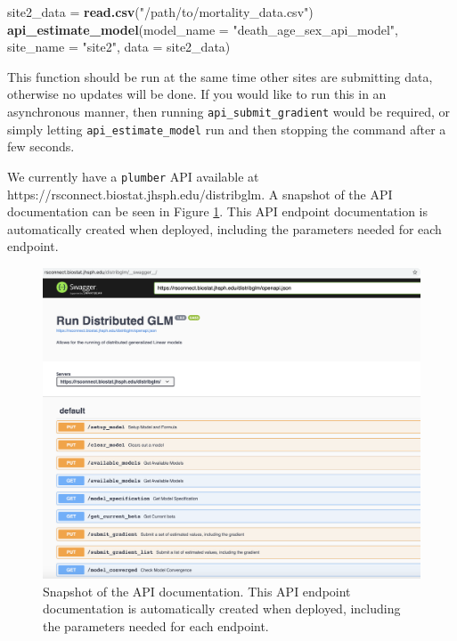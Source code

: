 \documentclass[]{elsarticle} %
\makeatletter
\newenvironment{Shaded}{\begin{snugshade}}{\end{snugshade}}
\newcommand{\DataTypeTok}[1]{\textcolor[rgb]{0.13,0.29,0.53}{#1}}
\newcommand{\KeywordTok}[1]{\textcolor[rgb]{0.13,0.29,0.53}{\textbf{#1}}}
\newcommand{\NormalTok}[1]{#1}
\newcommand{\StringTok}[1]{\textcolor[rgb]{0.31,0.60,0.02}{#1}}
\def\maxwidth{\ifdim\Gin@nat@width>\linewidth\linewidth
\else\Gin@nat@width\fi}
\let\Oldincludegraphics\includegraphics
\renewcommand{\includegraphics}[1]{\Oldincludegraphics[width=\maxwidth]{#1}}
\makeatother
\begin{document}
\begin{Shaded}
\begin{Highlighting}[]
\NormalTok{site2\_data =}\StringTok{ }\KeywordTok{read.csv}\NormalTok{(}\StringTok{"/path/to/mortality\_data.csv"}\NormalTok{)}
\KeywordTok{api\_estimate\_model}\NormalTok{(}\DataTypeTok{model\_name =}  \StringTok{"death\_age\_sex\_api\_model"}\NormalTok{, }
                   \DataTypeTok{site\_name =} \StringTok{"site2"}\NormalTok{, }\DataTypeTok{data =}\NormalTok{ site2\_data)}
\end{Highlighting}
\end{Shaded}

This function should be run at the same time other sites are submitting data, otherwise no updates will be done. If you would like to run this in an asynchronous manner, then running \texttt{api\_submit\_gradient} would be required, or simply letting \texttt{api\_estimate\_model} run and then stopping the command after a few seconds.

We currently have a \texttt{plumber} API available at https://rsconnect.biostat.jhsph.edu/distribglm. A snapshot of the API documentation can be seen in Figure \ref{fig:docs}. This API endpoint documentation is automatically created when deployed, including the parameters needed for each endpoint.

\begin{figure}
\centering
\includegraphics{docs.png}
\caption{\label{fig:docs}Snapshot of the API documentation. This API endpoint documentation is automatically created when deployed, including the parameters needed for each endpoint.}
\end{figure}
\end{document}
